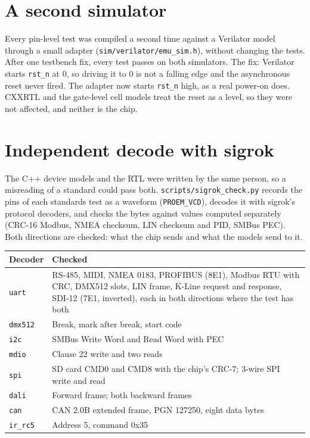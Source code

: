 \documentclass[11pt,a4paper]{article}
\newcommand{\sig}[1]{\texttt{#1}}
\begin{document}
\section{A second simulator}

Every pin-level test was compiled a second time against a Verilator model through a small adapter (\sig{sim/verilator/emu\_sim.h}), without changing the tests. After one testbench fix, every test passes on both simulators. The fix: Verilator starts \sig{rst\_n} at 0, so driving it to 0 is not a falling edge and the asynchronous reset never fired. The adapter now starts \sig{rst\_n} high, as a real power-on does. CXXRTL and the gate-level cell models treat the reset as a level, so they were not affected, and neither is the chip.

\section{Independent decode with sigrok}

The C++ device models and the RTL were written by the same person, so a misreading of a standard could pass both. \sig{scripts/sigrok\_check.py} records the pins of each standards test as a waveform (\sig{PROEM\_VCD}), decodes it with sigrok's protocol decoders, and checks the bytes against values computed separately (CRC-16 Modbus, NMEA checksum, LIN checksum and PID, SMBus PEC). Both directions are checked: what the chip sends and what the models send to it.

\begin{center}
\begin{tabularx}{\linewidth}{@{}l L@{}}
\toprule
Decoder & Checked \\
\midrule
\sig{uart} & RS-485, MIDI, NMEA 0183, PROFIBUS (8E1), Modbus RTU with CRC, DMX512 slots, LIN frame, K-Line request and response, SDI-12 (7E1, inverted), each in both directions where the test has both \\
\sig{dmx512} & Break, mark after break, start code \\
\sig{i2c} & SMBus Write Word and Read Word with PEC \\
\sig{mdio} & Clause 22 write and two reads \\
\sig{spi} & SD card CMD0 and CMD8 with the chip's CRC-7; 3-wire SPI write and read \\
\sig{dali} & Forward frame; both backward frames \\
\sig{can} & CAN 2.0B extended frame, PGN 127250, eight data bytes \\
\sig{ir\_rc5} & Address 5, command 0x35 \\
\bottomrule
\end{tabularx}
\end{center}
\end{document}
